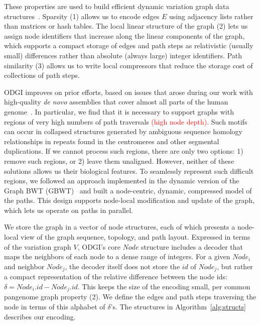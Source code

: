 \documentclass{bioinfo}
\newcommand{\red}[1]{{\textcolor{Red}{#1}}}
\newcommand{\FIXME}[1]{\red{[FIXME: #1]}}
\newcommand{\REVIEWED}[1]{{\textcolor{Red}{#1}}}
\begin{document}
These properties are used to build efficient dynamic variation graph data structures~\citep{Siren:2020,Eizenga_2020_BX}.
Sparsity (1) allows us to encode edges $E$ using adjacency lists rather than matrices or hash tables.
The local linear structure of the graph (2) lets us assign node identifiers that increase along the linear components of the graph, which supports a compact storage of edges and path steps as relativistic (usually small) differences rather than absolute (always large) integer identifiers.
Path similarity (3) allows us to write local compressors that reduce the storage cost of collections of path steps.

ODGI improves on prior efforts, based on issues that arose during our work with high-quality \textit{de novo} assemblies that cover almost all parts of the human genome~\citep{Logsdon_2021,Nurk_2021}.
In particular, we find that it is necessary to support graphs with regions of very high numbers of path traversals \REVIEWED{(high node depth)}.
Such motifs can occur in collapsed structures generated by ambiguous sequence homology relationships in repeats found in the centromeres and other segmental duplications.
If we cannot process such regions, there are only two options: 1) remove such regions, or 2) leave them unaligned.
However, neither of these solutions allows us  their biological features.
To seamlessly represent such difficult regions, we followed an approach implemented in the dynamic version of the Graph BWT (GBWT)~\citep{Siren:2020} and built a node-centric, dynamic, compressed model of the paths.
This design supports node-local modification and update of the graph, which lets us operate on paths in parallel.

We store the graph in a vector of node structures, each of which presents a node-local view of the graph sequence, topology, and path layout.
Expressed in terms of the variation graph $V$, ODGI's core $Node$ structure includes a decoder that maps the neighbors of each node to a dense range of integers.
For a given $Node_i$ and neighbor $Node_j$, the decoder itself does not store the $id$ of $Node_j$, but rather a compact representation of the relative difference between the node ids: $\delta = Node_i.id - Node_j.id$.
This keeps the size of the encoding small, per common pangenome graph property (2).
We define the edges and path steps traversing the node in terms of this alphabet of $\delta$'s.
The structures in Algorithm~\ref{alg:structs} describes our encoding.
\end{document}
